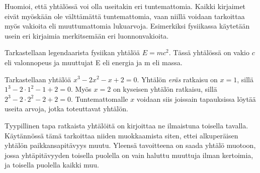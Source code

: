 Huomioi, että yhtälössä voi olla useitakin eri tuntemattomia. Kaikki kirjaimet eivät myöskään ole välttämättä tuntemattomia, vaan niillä voidaan tarkoittaa myös vakioita eli muuttumattomia lukuarvoja. Esimerkiksi fysiikassa käytetään usein eri kirjaimia merkitsemään eri luonnonvakioita.


\begin{esimerkki}
 Tarkastellaan legendaarista fysiikan yhtälöä $E=mc^2$. Tässä yhtälössä on vakio $c$ eli valonnopeus ja muuttujat E eli energia ja m eli massa.
\end{esimerkki}

\begin{esimerkki}
 Tarkastellaan yhtälöä $x^3-2x^2-x+2=0$. Yhtälön \textit{eräs} ratkaisu on $x=1$, sillä $1^3-2\cdot{1^2}-1+2=0$. 
 Myös $x=2$ on kyseisen yhtälön ratkaisu, sillä $2^3-2\cdot{2^2}-2+2=0$. 
 Tuntemattomalle $x$ voidaan siis joissain tapauksissa löytää useita arvoja, jotka toteuttavat yhtälön. 
\end{esimerkki}



Tyypillinen tapa ratkaista yhtälöitä on kirjoittaa ne ilmaistuna toisella tavalla.
Käytännössä tämä tarkoittaa niiden muokkaamista siten, ettei alkuperäisen yhtälön paikkansapitävyys muutu. 
Yleensä tavoitteena on saada yhtälö muotoon, jossa yhtäpitävyyden toisella puolella on vain haluttu muuttuja ilman kertoimia, ja toisella puolella kaikki muu.

